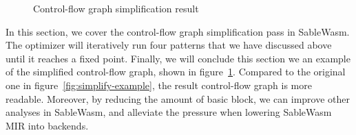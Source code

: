 \begin{figure}
    
    \caption{Control-flow graph simplification result}
    \label{fig:simplify-result}
\end{figure}

In this section, we cover the control-flow graph simplification pass in SableWasm. The optimizer will iteratively run four patterns that we have discussed above until it reaches a fixed point. Finally, we will conclude this section we an example of the simplified control-flow graph, shown in figure~\ref{fig:simplify-result}. Compared to the original one in figure~\ref{fig:simplify-example}, the result control-flow graph is more readable. Moreover, by reducing the amount of basic block, we can improve other analyses in SableWasm, and alleviate the pressure when lowering SableWasm MIR into backends.
